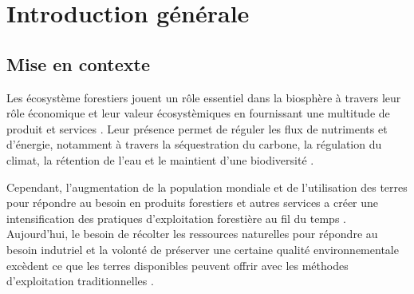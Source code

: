 \chapter*{Introduction générale}         %
\label{chap-introduction}       %


\section*{Mise en contexte}
\label{sec:contexte}


Les écosystème forestiers jouent un rôle essentiel dans la biosphère à travers leur rôle économique et leur valeur écosystèmiques en fournissant une multitude de produit et services \citep{Balvanera2006Quantifyingevidence}. 
Leur présence permet de réguler les flux de nutriments et d'énergie, notamment à travers la séquestration du carbone, la régulation du climat, la rétention de l'eau et le maintient d'une biodiversité \citep{Balvanera2006Quantifyingevidence,Diaz2006BiodiversityLoss,Canadell2008Managingforests,Pawson2013Plantationforests}. 


Cependant, l'augmentation de la population mondiale et de l'utilisation des terres pour répondre au besoin en produits forestiers et autres services a créer une intensification des pratiques d’exploitation forestière au fil du temps \citep{Foley2005GlobalConsequences}.
Aujourd'hui, le besoin de récolter les ressources naturelles pour répondre au besoin indutriel et la volonté de préserver une certaine qualité environnementale excèdent ce que les terres disponibles peuvent offrir avec les méthodes d'exploitation traditionnelles \citep{Sala2000Globalbiodiversity,Newbold2015Globaleffects}. 

